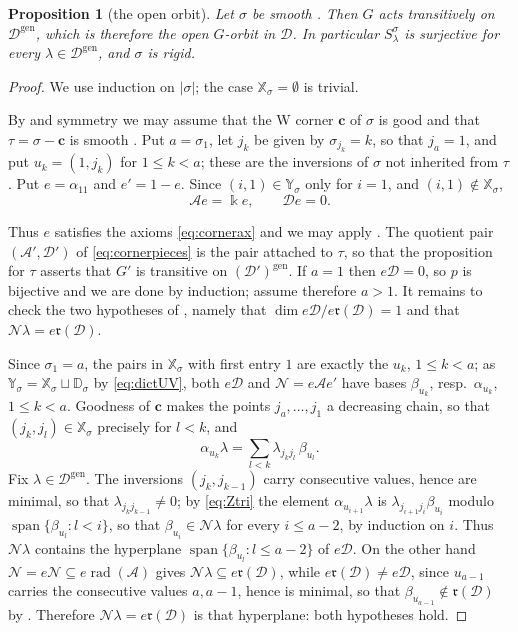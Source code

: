 \documentclass[12pt]{article}
\def\xspace{ }%
\newtheorem{proposition}[proposition]{Proposition}
\theoremstyle{definition}
\newcommand{\smth}{smooth\xspace}
\newcommand{\good}{good\xspace}
\newcommand{\Goodness}{Goodness\xspace}
\newcommand{\rbm}{\mathfrak{r}}  %
\newcommand{\kk}{\Bbbk}
\newcommand{\alg}{\mathcal{A}}   %
\newcommand{\bmdl}{\mathcal{D}}   %
\newcommand{\XX}{\mathbb{X}}  %
\newcommand{\YY}{\mathbb{Y}}  %
\newcommand{\DD}{\mathbb{D}}  %
\newcommand{\algbss}{\alpha}     %
\newcommand{\bmdlbss}{\beta}    %
\newcommand{\Sop}{S}
\newcommand{\rad}{\operatorname{rad}}
\newcommand{\gen}{\mathrm{gen}}         %
\newcommand{\Span}{\operatorname{span}}
\newcommand{\Wcr}{W\xspace}    %
\newcommand{\crn}{\mathbf{c}}              %
\begin{document}
\begin{proposition}[the open orbit]\label{prop:covparam}
Let $\sigma$ be \smth. Then $G$ acts transitively on $\bmdl^{\gen}$,
which is therefore the open $G$-orbit in $\bmdl$.
In particular $\Sop^\sigma_\lambda$ is surjective for every $\lambda \in
\bmdl^{\gen}$, and $\sigma$ is rigid.
\end{proposition}


\begin{proof}
We use induction on $|\sigma|$; the case $\XX_\sigma = \emptyset$ is trivial.

By  and symmetry we may assume that the \Wcr corner
$\crn$ of $\sigma$ is \good and that $\tau = \sigma - \crn$ is \smth. Put
$a = \sigma_1$, let $j_k$ be given by $\sigma_{j_k} = k$, so that $j_a = 1$,
and put $u_k = (1,j_k)$ for $1 \le k < a$; these are the inversions of
$\sigma$ not inherited from $\tau$. Put $e = \algbss_{11}$ and $e' = 1-e$. Since
$(i,1) \in \YY_\sigma$ only for $i=1$, and $(i,1) \notin \XX_\sigma$,
\begin{equation}\label{eq:Wsplit}
   \alg e = \kk e, \qquad \bmdl e = 0 .
\end{equation}

Thus $e$ satisfies the axioms \eqref{eq:cornerax} and we may apply
. The quotient pair $(\alg',\bmdl')$ of
\eqref{eq:cornerpieces} is the pair attached to $\tau$, so that the
proposition for $\tau$ asserts that $G'$ is transitive on
$(\bmdl')^{\gen}$. If $a = 1$ then
$e\bmdl = 0$, so $p$ is bijective and we are done by induction; assume
therefore $a>1$. It remains to check the two hypotheses of
, namely that $\dim
e\bmdl/e\rbm(\bmdl) = 1$ and that $\mathcal N\lambda = e\rbm(\bmdl)$.

Since $\sigma_1 = a$, the pairs in $\XX_\sigma$
with first entry $1$ are exactly the $u_k$, $1 \le k < a$; as $\YY_\sigma
= \XX_\sigma\sqcup\DD_\sigma$ by \eqref{eq:dictUV}, both $e\bmdl$ and $\mathcal N =
e\alg e'$ have bases $\bmdlbss_{u_k}$, resp.\ $\algbss_{u_k}$, $1 \le k <
a$. \Goodness of $\crn$ makes the points $j_a,\dots,j_1$ a decreasing
chain, so that $(j_k,j_l) \in \XX_\sigma$ precisely for $l<k$, and
\begin{equation}\label{eq:Ztri}
   \algbss_{u_k}\lambda = \sum_{l<k}\lambda_{j_kj_l}\,\bmdlbss_{u_l} .
\end{equation}
Fix $\lambda \in \bmdl^{\gen}$. The inversions $(j_k,j_{k-1})$ carry
consecutive values, hence are minimal, so that $\lambda_{j_kj_{k-1}} \ne
0$; by \eqref{eq:Ztri} the element $\algbss_{u_{i+1}}\lambda$ is
$\lambda_{j_{i+1}j_i}\bmdlbss_{u_i}$ modulo $\Span\{\bmdlbss_{u_l} :
l<i\}$, so that $\bmdlbss_{u_i} \in \mathcal N\lambda$ for every $i \le a-2$, by
induction on $i$.
Thus $\mathcal N\lambda$ contains the hyperplane $\Span\{\bmdlbss_{u_l} : l \le
a-2\}$ of $e\bmdl$. On the other hand $\mathcal N = e\mathcal N \subseteq e\rad(\alg)$ gives
$\mathcal N\lambda \subseteq e\rbm(\bmdl)$, while $e\rbm(\bmdl) \ne e\bmdl$, since
$u_{a-1}$ carries the consecutive values $a,a-1$, hence is minimal, so
that $\bmdlbss_{u_{a-1}} \notin \rbm(\bmdl)$ by . Therefore
$\mathcal N\lambda = e\rbm(\bmdl)$ is that hyperplane: both hypotheses hold.


\end{proof}
\end{document}
